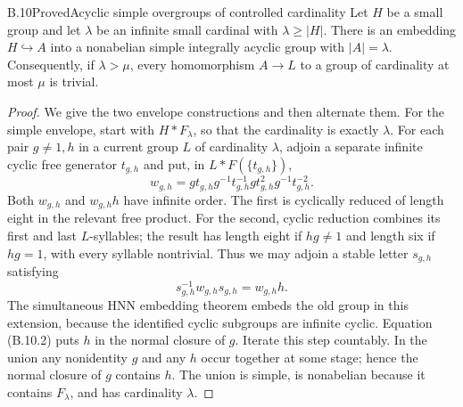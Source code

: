 \begin{claim}{B.10}{Proved}{Acyclic simple overgroups of controlled cardinality}
Let $H$ be a small group and let $\lambda$ be an infinite
small cardinal with $\lambda\geq|H|$. There is an embedding
$H\hookrightarrow A$ into a nonabelian simple integrally
acyclic group with $|A|=\lambda$. Consequently, if
$\lambda>\mu$, every homomorphism $A\to L$ to a group of
cardinality at most $\mu$ is trivial.
\end{claim}
\begin{proof}
We give the two envelope constructions and then alternate them.
For the simple envelope, start with $H*F_\lambda$, so that
the cardinality is exactly $\lambda$. For each pair
$g\ne1,h$ in a current group $L$ of cardinality $\lambda$,
adjoin a separate infinite cyclic free generator $t_{g,h}$
and put, in $L*F(\{t_{g,h}\})$,
\[
 w_{g,h}=g t_{g,h}g^{-1}t_{g,h}^{-1}
          g t_{g,h}^{2}g^{-1}t_{g,h}^{-2}.
 \tag{B.10.1}
\]
Both $w_{g,h}$ and $w_{g,h}h$ have infinite order. The first
is cyclically reduced of length eight in the relevant free
product. For the second, cyclic reduction combines its first
and last $L$-syllables; the result has length eight if $hg\ne1$
and length six if $hg=1$, with every syllable nontrivial.
Thus we may adjoin a stable letter $s_{g,h}$ satisfying
\[
 s_{g,h}^{-1}w_{g,h}s_{g,h}=w_{g,h}h.
 \tag{B.10.2}
\]
The simultaneous HNN embedding theorem
\citep[Theorem~II]{HigmanNeumannNeumann1949} embeds the old
group in this extension, because the identified cyclic
subgroups are infinite cyclic. Equation (B.10.2) puts $h$
in the normal closure of $g$. Iterate this step countably.
In the union any nonidentity $g$ and any $h$ occur together
at some stage; hence the normal closure of $g$ contains $h$.
The union is simple, is nonabelian because it contains
$F_\lambda$, and has cardinality $\lambda$.


\end{proof}
